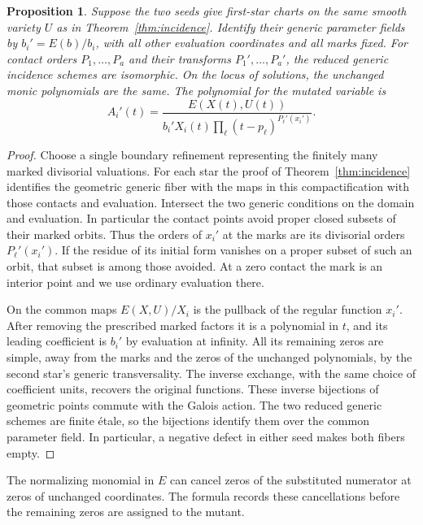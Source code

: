 \documentclass[11pt,reqno]{amsart}
\numberwithin{equation}{section}
\newtheorem{proposition}[theorem]{Proposition}
\theoremstyle{definition}
\theoremstyle{remark}
\begin{document}
\begin{proposition}\label{prop:incidence-mutation}
Suppose the two seeds give first-star charts on the same smooth
variety \(U\) as in Theorem~\ref{thm:incidence}. Identify their generic
parameter fields by \(b_i'=E(b)/b_i\), with all other evaluation
coordinates and all marks fixed. For contact orders \(P_1,\ldots,P_a\)
and their transforms \(P_1',\ldots,P_a'\), the reduced generic
incidence schemes are isomorphic. On the locus of solutions,
the unchanged monic polynomials are the same. The polynomial for the
mutated variable is
\[ A_i'(t)= \frac{E(X(t),U(t))} {b_i' X_i(t)\prod_{\ell}(t-p_\ell)^{P_\ell'(x_i')}} . \]
\end{proposition}
\begin{proof}
Choose a single boundary refinement representing the finitely many
marked divisorial valuations. For each star the proof of
Theorem~\ref{thm:incidence} identifies the geometric generic fiber
with the maps in this compactification with those contacts and
evaluation. Intersect the two generic conditions on the domain and
evaluation. In particular the contact points avoid proper closed
subsets of their marked orbits. Thus the orders of \(x_i'\) at the
marks are its divisorial orders \(P_\ell'(x_i')\). If the residue
of its initial form vanishes on a proper subset of such an orbit,
that subset is among those avoided. At a zero contact the mark is
an interior point and we use ordinary evaluation there.

On the common maps \(E(X,U)/X_i\) is the pullback of the regular
function \(x_i'\). After removing the prescribed marked factors it
is a polynomial in \(t\), and its leading coefficient is \(b_i'\)
by evaluation at infinity. All its remaining zeros are simple,
away from the marks and the zeros of the unchanged polynomials, by
the second star's generic transversality. The inverse exchange, with the same choice of coefficient units,
recovers the original functions. These inverse bijections of geometric
points commute with the Galois action. The two reduced generic schemes
are finite \'{e}tale, so the bijections identify them over the common
parameter field. In particular, a negative defect in either seed makes
both fibers empty.
\end{proof}

The normalizing monomial in \(E\) can cancel zeros of the substituted
numerator at zeros of unchanged coordinates. The formula records these
cancellations before the remaining zeros are assigned to the mutant.
\end{document}
